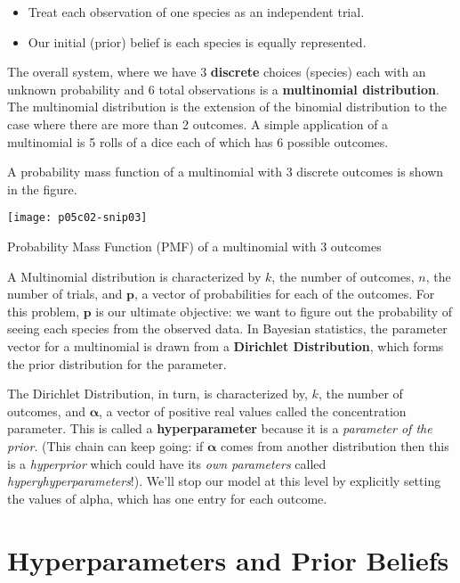 \begin{itemize}
\item Treat each observation of one species as an independent trial.
\item Our initial (prior) belief is each species is equally represented.
\end{itemize}

The overall system, where we have 3 \textbf{discrete} choices (species) each with an unknown probability and 6 total observations is a\textbf{ multinomial distribution}. The multinomial distribution is the extension of the binomial distribution to the case where there are more than 2 outcomes. A simple application of a multinomial is 5 rolls of a dice each of which has 6 possible outcomes.

A probability mass function \cite{WikipeadiaProbabilitymassfunction2019} of a multinomial with 3 discrete outcomes is shown in the figure.

\begin{marginfigure}
    \texttt{[image: p05c02-snip03]}
    \caption{Probability Mass Function (PMF) of a multinomial with 3 outcomes}
    \end{marginfigure}

A Multinomial distribution is characterized by $k$, the number of outcomes, $n$, the number of trials, and 
$\mathbf {p}$, a vector of probabilities for each of the outcomes. For this problem, $\mathbf {p}$ is our ultimate objective: we want to figure out the probability of seeing each species from the observed data. In Bayesian statistics, the parameter vector for a multinomial is drawn from a \textbf{Dirichlet Distribution}, which forms the prior distribution for the parameter.

The Dirichlet Distribution, in turn, is characterized by, $k$, the number of outcomes, and  $\boldsymbol {\alpha }$, a vector of positive real values called the concentration parameter. This is called a \textbf{hyperparameter} because it is a \textit{parameter of the prior}. (This chain can keep going: if  $\boldsymbol {\alpha }$ comes from another distribution then this is a \textit{hyperprior} which could have its \textit{own parameters} called \textit{hyperyhyperparameters}!). We'll stop our model at this level by explicitly setting the values of alpha, which has one entry for each outcome.

\section{Hyperparameters and Prior Beliefs}

